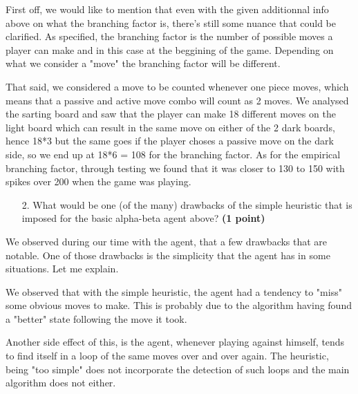 \documentclass[11pt,a4paper]{report}
\begin{document}
\begin{answers}[5cm]
    First off, we would like to mention that even with the given additionnal info above on what the branching factor is, there's still some nuance that could be clarified. 
    As specified, the branching factor is the number of possible moves a player can make and in this case at the beggining of the game. Depending on what we consider a "move" the branching factor will be different.

    That said, we considered a move to be counted whenever one piece moves, which means that a passive and active move combo will count as 2 moves. We analysed the sarting board and saw that the player can make 18 different moves on the light board which can result in the same move on either of the 2 dark boards, hence 18*3 but the same goes if the player choses a passive move on the dark side, so
    we end up at 18*6 = 108 for the branching factor. As for the empirical branching factor, through testing we found that it was closer to 130 to 150 with spikes over 200 when the game was playing.
    \end{answers}



\begin{enumerate}
\item[2.] What would be one (of the many) drawbacks of the simple heuristic that is imposed for the basic alpha-beta agent above? \textbf{(1 point)}
\end{enumerate}

\begin{answers}[10cm]
    We observed during our time with the agent, that a few drawbacks that are notable. One of those drawbacks is the simplicity that the agent has in some situations. Let me explain.

    We observed that with the simple heuristic, the agent had a tendency to "miss" some obvious moves to make. This is probably due to the algorithm having found a "better" state following the move it took. 
    
    Another side effect of this, is the agent, whenever playing against himself, tends to find itself in a loop of the same moves over and over again. The heuristic, being "too simple" does not incorporate the detection of such loops and the main algorithm does not either. 

\end{answers}
\end{document}
